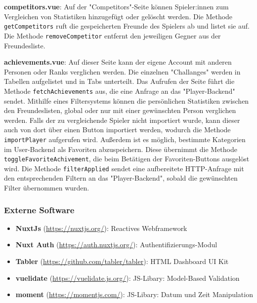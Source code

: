 \textbf{competitors.vue}: Auf der "Competitors"-Seite können Spieler:innen zum Vergleichen von Statistiken hinzugefügt oder gelöscht werden. Die Methode \verb|getCompetitors| ruft die gespeicherten
Freunde des Spielers ab und listet sie auf. Die Methode \verb|removeCompetitor| entfernt den jeweiligen Gegner aus der Freundesliste.
\newline

\textbf{achievements.vue}: Auf dieser Seite kann der eigene Account mit anderen Personen oder Ranks verglichen werden. Die einzelnen "Challanges" werden in Tabellen aufgelistet und in Tabs unterteilt.
Das Aufrufen der Seite führt die Methode \verb|fetchAchievements| aus, die eine Anfrage an das "Player-Backend" sendet. Mithilfe eines Filtersystems können die persönlichen
Statistiken zwischen den Freundeslisten, global oder nur mit einer gewünschten Person verglichen werden. Falls der zu vergleichende Spieler nicht importiert wurde, kann dieser auch von dort über einen 
Button importiert werden, wodurch die Methode \verb|importPlayer| aufgerufen wird. Außerdem ist es möglich, bestimmte Kategorien im User-Backend als Favoriten abzuspeichern. Diese übernimmt die Methode
\verb|toggleFavoriteAchivement|, die beim Betätigen der Favoriten-Buttons ausgelöst wird. Die Methode \verb|filterApplied| sendet eine aufbereitete HTTP-Anfrage mit den entsprechenden Filtern
an das "Player-Backend", sobald die gewünschten Filter übernommen wurden.
\newline

\subsubsection{Externe Software}
\begin{itemize}
    \item \textbf{NuxtJs} (\href{https://nuxtjs.org/}{https://nuxtjs.org/}): Reactives Webframework
    \item \textbf{Nuxt Auth} (\href{https://auth.nuxtjs.org/}{https://auth.nuxtjs.org/}): Authentifizierungs-Modul
    \item \textbf{Tabler} (\href{https://github.com/tabler/tabler}{https://github.com/tabler/tabler}): HTML Dashboard UI Kit
    \item \textbf{vuelidate} (\href{https://vuelidate.js.org/}{https://vuelidate.js.org/}): JS-Libary: Model-Based Validation
    \item \textbf{moment} (\href{https://momentjs.com/}{https://momentjs.com/}): JS-Libary: Datum und Zeit Manipulation
\end{itemize}